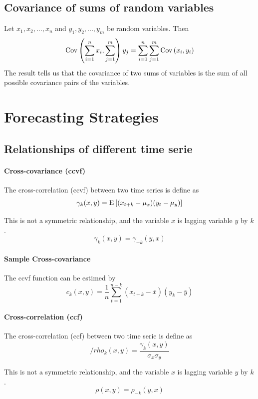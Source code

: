 \subsection{Covariance of sums of random variables}
Let $x_1, x_2,...,x_n$ and $y_1, y_2,..., y_m$ be random variables. Then 
\[ \mathrm{Cov} \left( \sum_{i=1}^{n} x_i, \sum_{j=1}^{m} \right) y_j = \sum_{i=1}^{n} \sum_{j=1}^{m} \mathrm{Cov} \left( x_i, y_i \right) \]
The result tells us that the covariance of two sums of variables is the sum of all possible covariance pairs of the variables.

\section{Forecasting Strategies}

\subsection{Relationships of different time serie}

\paragraph{Cross-covariance (ccvf)}
The cross-correlation (ccvf) between two time series is define as
\[ \gamma_k(x, y) = \mathrm{E}_{} \left[ (x_{t+k} - \mu_x)(y_t - \mu_y) \right] \]

\begin{note}
    This is not a symmetric relationship, and the variable $x$ is lagging variable $y$ by $k$.
    \[\gamma_k(x, y) = \gamma_{-k}(y, x) \]
\end{note}

\paragraph{Sample Cross-covariance}
The ccvf function can be estimed by
\[ c_k(x, y) = \frac{1}{n} \sum_{t=1}^{n-k} (x_{t+k} - \bar{x})(y_k - \bar{y}) \]

\paragraph{Cross-correlation (ccf)}
The cross-correlation (ccf) between two time serie is define as 
\[ /rho_k(x, y) = \frac{\gamma_k(x, y)}{\sigma_x\sigma_y} \]

\begin{note}
    This is not a symmetric relationship, and the variable $x$ is lagging variable $y$ by $k$.
    \[\rho(x, y) = \rho_{-k}(y, x) \]
\end{note}

